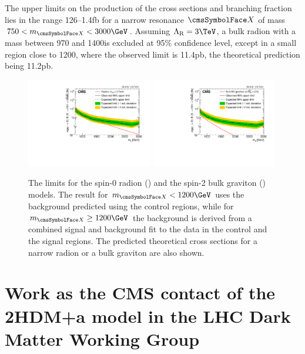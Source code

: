 The upper limits on the production of the cross sections and branching fraction lies in the range 126--1.4\unit{fb} for a narrow resonance $\PX$ of mass  $750 < \mx <  3000\GeV$. Assuming $\LambdaR = 3\TeV$, a bulk radion with a mass between 970 and 1400\GeV is excluded at 95\% confidence level, except in a small region close to 1200\GeV, where the observed limit is 11.4\unit{pb}, the theoretical prediction being 11.2\unit{pb}.


\begin{figure}[htb]
  \centering
  \includegraphics[width=0.49\textwidth]{B2G-16-026/Figure_009-a.pdf}
  \includegraphics[width=0.49\textwidth]{B2G-16-026/Figure_009-b.pdf}
  \caption{The limits for the spin-0 radion (\cmsLeft) and the
    spin-2 bulk graviton (\cmsRight) models. The result for $\mx < 1200\GeV$ uses the background predicted using the control regions, while for $\mx \ge 1200\GeV$ the background is derived from a combined signal and background fit to the data in the control and the signal regions. The
    predicted theoretical cross sections for a narrow radion or a bulk
    graviton are also
    shown.}
  \label{fig:lim_rad_grav_comb}
\end{figure}




\section{Work as the CMS contact of the 2HDM+a model in the LHC Dark Matter Working Group}

